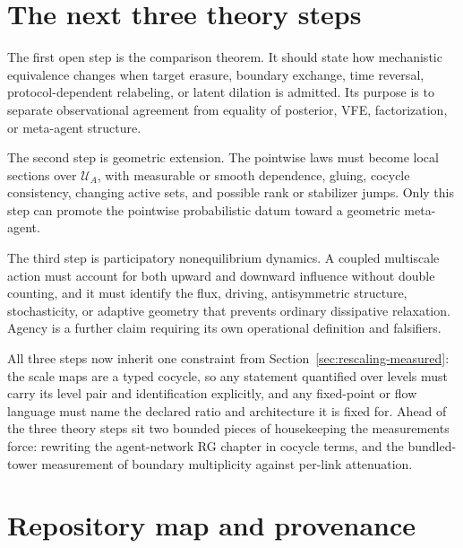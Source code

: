 \documentclass[11pt,letterpaper]{article}
\begin{document}
\section{The next three theory steps}
\label{sec:next-steps}

The first open step is the comparison theorem. It should state how mechanistic equivalence changes when target erasure, boundary exchange, time reversal, protocol-dependent relabeling, or latent dilation is admitted. Its purpose is to separate observational agreement from equality of posterior, VFE, factorization, or meta-agent structure.

The second step is geometric extension. The pointwise laws must become local sections over \(\mathcal U_A\), with measurable or smooth dependence, gluing, cocycle consistency, changing active sets, and possible rank or stabilizer jumps. Only this step can promote the pointwise probabilistic datum toward a geometric meta-agent.

The third step is participatory nonequilibrium dynamics. A coupled multiscale action must account for both upward and downward influence without double counting, and it must identify the flux, driving, antisymmetric structure, stochasticity, or adaptive geometry that prevents ordinary dissipative relaxation. Agency is a further claim requiring its own operational definition and falsifiers.

All three steps now inherit one constraint from Section~\ref{sec:rescaling-measured}: the scale maps are a typed cocycle, so any statement quantified over levels must carry its level pair and identification explicitly, and any fixed-point or flow language must name the declared ratio and architecture it is fixed for. Ahead of the three theory steps sit two bounded pieces of housekeeping the measurements force: rewriting the agent-network RG chapter in cocycle terms, and the bundled-tower measurement of boundary multiplicity against per-link attenuation.

\section{Repository map and provenance}
\label{sec:provenance}
\end{document}
